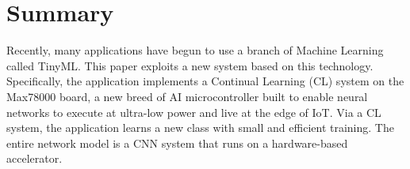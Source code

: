 \chapter*{Summary}
\label{Summary}

\quad Recently, many applications have begun to use a branch of Machine Learning called TinyML. This paper exploits a new system based on this technology. Specifically, the application implements a Continual Learning (CL) system on the Max78000 board, a new breed of AI microcontroller built to enable neural networks to execute at ultra-low power and live at the edge of IoT. Via a CL system, the application learns a new class with small and efficient training. The entire network model is a CNN system that runs on a hardware-based accelerator. 

\clearpage
\newpage
\mbox{~}
\clearpage
\newpage




